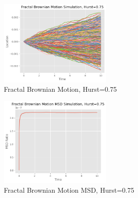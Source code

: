 \documentclass{article}
\begin{document}
\begin{enumerate}
\begin{figure}[h]
\end{figure}
\begin{figure}[h]
\caption{Fractal Brownian Motion, Hurst=0.75}
\centering
\includegraphics[width=0.5\textwidth]{fractal_brownian_motion_simulation_0.75.png}
\end{figure}
\begin{figure}[h]
\caption{Fractal Brownian Motion MSD, Hurst=0.75}
\centering
\includegraphics[width=0.5\textwidth]{fbm_msd_0.75.png}
\end{figure}
\end{enumerate}
\end{document}
